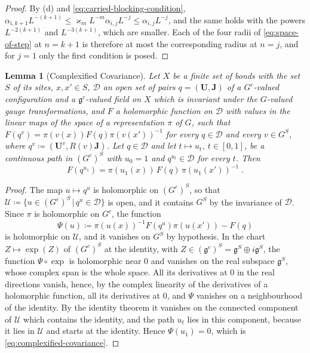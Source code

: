 \documentclass[11pt]{preprint}
\numberwithin{equation}{section}
\newtheorem{lemma}[theorem]{Lemma}
\theoremstyle{definition}
\theoremstyle{remark}
\theoremstyle{plain}
\begin{document}
\begin{proof}
By (d) and \eqref{eq:carried-blocking-condition}, $\alpha_{i,k+1}L^{-(k+1)} \leq \varkappa_mL^{-m}\alpha_{i,j}L^{-j} \leq \alpha_{i,j}L^{-j}$, and the same holds with the powers $L^{-2(k+1)}$ and $L^{-3(k+1)}$, which are smaller. Each of the four radii of \eqref{eq:space-of-step} at $n = k + 1$ is therefore at most the corresponding radius at $n = j$, and for $j = 1$ only the first condition is posed.
\end{proof}

\begin{lemma}[Complexified Covariance]\label{lem:complexified-covariance}
Let $X$ be a finite set of bonds with the set $S$ of its sites, $x, x' \in S$, $\mathcal D$ an open set of pairs $q = (\mathbf U, \mathbf J)$ of a $G^c$-valued configuration and a $\mathfrak g^c$-valued field on $X$ which is invariant under the $G$-valued gauge transformations, and $F$ a holomorphic function on $\mathcal D$ with values in the linear maps of the space of a representation $\pi$ of $G$, such that $F(q^v) = \pi(v(x))F(q)\pi(v(x'))^{-1}$ for every $q \in \mathcal D$ and every $v \in G^S$, where $q^v \coloneqq (\mathbf U^v, R(v)\mathbf J)$. Let $q \in \mathcal D$ and let $t \mapsto u_t$, $t \in [0, 1]$, be a continuous path in $(G^c)^S$ with $u_0 = 1$ and $q^{u_t} \in \mathcal D$ for every $t$. Then
\begin{equation}\label{eq:complexified-covariance}
    F(q^{u_1}) = \pi(u_1(x))\,F(q)\,\pi(u_1(x'))^{-1}\;.
\end{equation}
\end{lemma}

\begin{proof}
The map $u \mapsto q^u$ is holomorphic on $(G^c)^S$, so that $\mathcal U \coloneqq \{ u \in (G^c)^S \,|\, q^u \in \mathcal D \}$ is open, and it contains $G^S$ by the invariance of $\mathcal D$. Since $\pi$ is holomorphic on $G^c$, the function
\[
    \Psi(u) \coloneqq \pi(u(x))^{-1}F(q^u)\pi(u(x')) - F(q)
\]
is holomorphic on $\mathcal U$, and it vanishes on $G^S$ by hypothesis. In the chart $Z \mapsto \exp(Z)$ of $(G^c)^S$ at the identity, with $Z \in (\mathfrak g^c)^S = \mathfrak g^S \oplus i\mathfrak g^S$, the function $\Psi \circ \exp$ is holomorphic near $0$ and vanishes on the real subspace $\mathfrak g^S$, whose complex span is the whole space. All its derivatives at $0$ in the real directions vanish, hence, by the complex linearity of the derivatives of a holomorphic function, all its derivatives at $0$, and $\Psi$ vanishes on a neighbourhood of the identity. By the identity theorem it vanishes on the connected component of $\mathcal U$ which contains the identity, and the path $u_t$ lies in this component, because it lies in $\mathcal U$ and starts at the identity. Hence $\Psi(u_1) = 0$, which is \eqref{eq:complexified-covariance}.
\end{proof}
\end{document}

